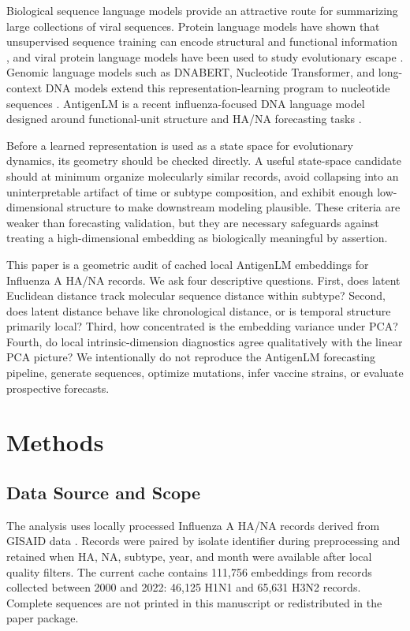 \documentclass[11pt]{article}
\begin{document}
Biological sequence language models provide an attractive route for summarizing large collections of viral sequences. Protein language models have shown that unsupervised sequence training can encode structural and functional information \cite{rives2021biological}, and viral protein language models have been used to study evolutionary escape \cite{hie2021viral}. Genomic language models such as DNABERT, Nucleotide Transformer, and long-context DNA models extend this representation-learning program to nucleotide sequences \cite{ji2021dnabert,dallatorre2025nucleotide,nguyen2023hyenadna}. AntigenLM is a recent influenza-focused DNA language model designed around functional-unit structure and HA/NA forecasting tasks \cite{pei2026antigenlm}.

Before a learned representation is used as a state space for evolutionary dynamics, its geometry should be checked directly. A useful state-space candidate should at minimum organize molecularly similar records, avoid collapsing into an uninterpretable artifact of time or subtype composition, and exhibit enough low-dimensional structure to make downstream modeling plausible. These criteria are weaker than forecasting validation, but they are necessary safeguards against treating a high-dimensional embedding as biologically meaningful by assertion.

This paper is a geometric audit of cached local AntigenLM embeddings for Influenza A HA/NA records. We ask four descriptive questions. First, does latent Euclidean distance track molecular sequence distance within subtype? Second, does latent distance behave like chronological distance, or is temporal structure primarily local? Third, how concentrated is the embedding variance under PCA? Fourth, do local intrinsic-dimension diagnostics agree qualitatively with the linear PCA picture? We intentionally do not reproduce the AntigenLM forecasting pipeline, generate sequences, optimize mutations, infer vaccine strains, or evaluate prospective forecasts.

\section{Methods}

\subsection{Data Source and Scope}

The analysis uses locally processed Influenza A HA/NA records derived from GISAID data \cite{shu2017gisaid}. Records were paired by isolate identifier during preprocessing and retained when HA, NA, subtype, year, and month were available after local quality filters. The current cache contains 111,756 embeddings from records collected between 2000 and 2022: 46,125 H1N1 and 65,631 H3N2 records. Complete sequences are not printed in this manuscript or redistributed in the paper package.
\end{document}
